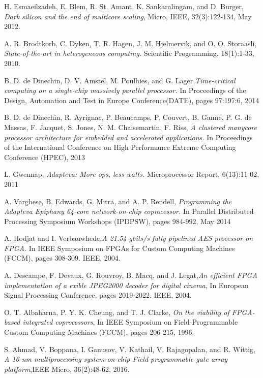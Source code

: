 \begin{thebibliography}{1}

	H. Esmaeilzadeh, E. Blem, R. St. Amant, K. Sankaralingam, and D. Burger, \emph{Dark silicon and the end of multicore scaling}, Micro, IEEE, 32(3):122-134, May 2012.
	
	A. R. Brodtkorb, C. Dyken, T. R. Hagen, J. M. Hjelmervik, and O. O. Storaasli, \emph{State-of-the-art in heterogeneous computing.} Scientific Programming, 18(1):1-33, 2010.

	B. D. de Dinechin, D. V. Amstel, M. Poulhies, and G. Lager,\emph{Time-critical computing on a single-chip massively parallel processor.} In Proceedings of the Design, Automation and Test in Europe Conference(DATE), pages 97:197:6, 2014 
	
	B. D. de Dinechin, R. Ayrignac, P. Beaucamps, P. Couvert, B. Ganne, P. G. de Massas, F. Jacquet, S. Jones, N. M. Chaisemartin, F. Riss, \emph{A clustered manycore processor architecture for embedded and accelerated applications.} In Proceedings of the International Conference on High Performance Extreme Computing Conference (HPEC), 2013
	
	L. Gwennap, \emph{Adapteva: More ops, less watts.} Microprocessor Report, 6(13):11-02, 2011

	A. Varghese, B. Edwards, G. Mitra, and A. P. Rendell, \emph{Programming the Adapteva Epiphany 64-core network-on-chip coprocessor.} In Parallel Distributed Processing Symposium Workshops (IPDPSW), pages 984-992, May 2014
	
	A. Hodjat and I. Verbauwhede,\emph{A 21.54 gbits/s fully pipelined AES processor on FPGA.} In IEEE Symposium on FPGAs for Custom Computing Machines (FCCM), pages 308-309. IEEE, 2004.
	
	A. Descampe, F. Devaux, G. Rouvroy, B. Macq, and J. Legat,\emph{An efficient FPGA implementation of a exible JPEG2000 decoder for digital cinema}, In European Signal Processing Conference, pages 2019-2022. IEEE, 2004.
	
	O. T. Albaharna, P. Y. K. Cheung, and T. J. Clarke, \emph{On the viability of FPGA-based integrated coprocessors}, In IEEE Symposium on Field-Programmable Custom Computing Machines (FCCM), pages 206-215, 1996.
	
	S. Ahmad, V. Boppana, I. Ganusov, V. Kathail, V. Rajagopalan, and R. Wittig, \emph{A 16-nm multiprocessing system-on-chip Field-programmable gate array platform},IEEE Micro, 36(2):48-62, 2016.
	

\end{thebibliography}
